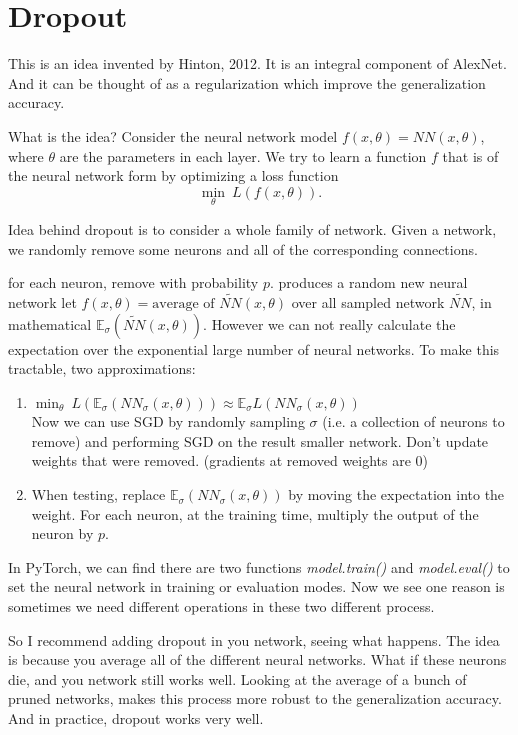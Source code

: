 \section{Dropout} 
This is an idea invented by Hinton, 2012. 
It is an integral component of AlexNet.
And it can be thought of as a regularization which improve the generalization accuracy.

What is the idea? Consider the neural network model $f(x, \theta) = NN(x, \theta)$, where $\theta$ are the parameters in each layer. We try to learn a function $f$ that is of the neural network form by optimizing a loss function $$\min_\theta\ L(f(x,\theta)).$$

Idea behind dropout is to consider a whole family of network. 
Given a network, we randomly remove some neurons and all of the corresponding connections.

for each neuron, remove with probability $p$.
produces a random new neural network
let $f(x,\theta) = \textrm{average of } \tilde{NN}(x,\theta)$ over all sampled network $\tilde{NN}$, in mathematical $\mathbb{E}_\sigma(\tilde{NN}(x,\theta))$. 
However we can not really calculate the expectation over the exponential large number of neural networks. 
To make this tractable, two approximations: 
\begin{enumerate}
\item $\min_\theta\ L(\mathbb{E}_\sigma (NN_\sigma (x, \theta))) \approx \mathbb{E}_\sigma L(NN_\sigma (x,\theta))$ \\
Now we can use SGD by randomly sampling
$\sigma$ (i.e. a collection of neurons to remove)
and performing SGD on the result smaller network. Don't update weights that were removed. (gradients at removed weights are 0) \\
\item When testing, replace $\mathbb{E}_\sigma(NN_\sigma(x,\theta))$ by moving the expectation into the weight. For each neuron, at the training time, multiply the output of the neuron by $p$.
\end{enumerate}

In PyTorch, we can find there are two functions 
\emph{model.train()} and \emph{model.eval()} to set the neural network in training or evaluation modes. Now we see one reason is sometimes we need different operations in these two different process.

So I recommend adding dropout in you network, seeing what happens. The idea is because you average all of the different neural networks. What if these neurons die, and you network still works well. Looking at the average of a bunch of pruned networks, makes this process more robust to the generalization accuracy. And in practice, dropout works very well.

